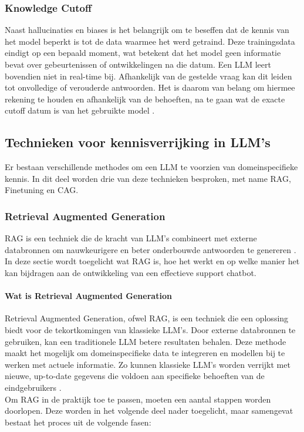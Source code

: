 \subsubsection{Knowledge Cutoff}
Naast hallucinaties en biases is het belangrijk om te beseffen dat de kennis van het model beperkt is tot de data waarmee het werd getraind. Deze trainingsdata eindigt op een bepaald moment, wat betekent dat het model geen informatie bevat over gebeurtenissen of ontwikkelingen na die datum. Een LLM leert bovendien niet in real-time bij. Afhankelijk van de gestelde vraag kan dit leiden tot onvolledige of verouderde antwoorden. Het is daarom van belang om hiermee rekening te houden en afhankelijk van de behoeften, na te gaan wat de exacte cutoff datum is van het gebruikte model \autocite{Hadi2023}.
 
 
\subsection{Technieken voor kennisverrijking in LLM’s}

Er bestaan verschillende methodes om een LLM te voorzien van domeinspecifieke kennis. In dit deel worden drie van deze technieken besproken, met name RAG, Finetuning en CAG. 
 
\subsubsection{Retrieval Augmented Generation}

RAG is een techniek die de kracht van LLM’s combineert met externe databronnen om nauwkeurigere en beter onderbouwde antwoorden te genereren \autocite{wu2025retrievalaugmentedgenerationnaturallanguage}. 
In deze sectie wordt toegelicht wat RAG is, hoe het werkt en op welke manier het kan bijdragen aan de ontwikkeling van een effectieve support chatbot.

\paragraph{Wat is Retrieval Augmented Generation}
Retrieval Augmented Generation, ofwel RAG, is een techniek die een oplossing biedt voor de tekortkomingen van klassieke LLM’s. Door externe databronnen te gebruiken, kan een traditionele LLM betere resultaten behalen. Deze methode maakt het mogelijk om domeinspecifieke data te integreren en modellen bij te werken met actuele informatie. Zo kunnen klassieke LLM’s worden verrijkt met nieuwe, up-to-date gegevens die voldoen aan specifieke behoeften van de eindgebruikers \autocite{wu2025retrievalaugmentedgenerationnaturallanguage}.
\\[1em]
Om RAG in de praktijk toe te passen, moeten een aantal stappen worden doorlopen. Deze worden in het volgende deel nader toegelicht, maar samengevat bestaat het proces uit de volgende fasen:

